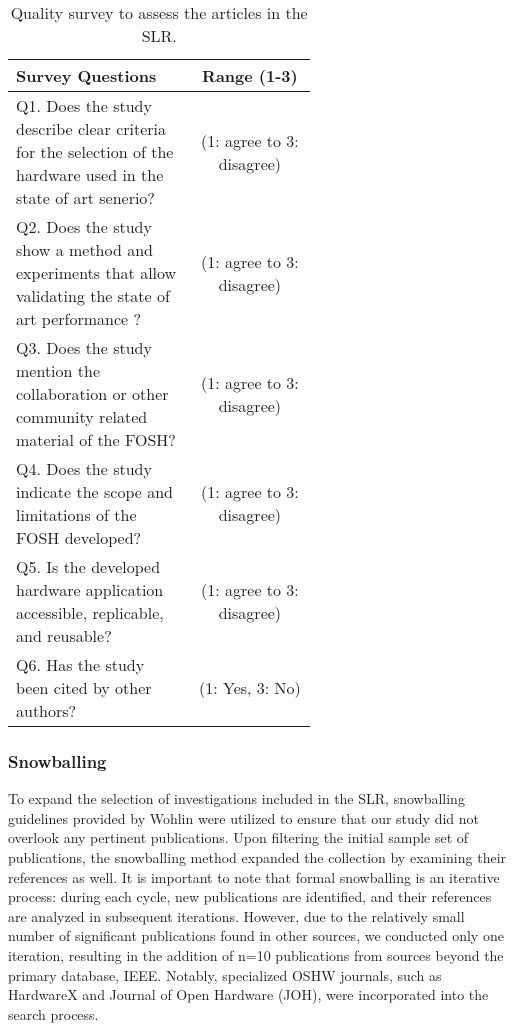 \begin{table}[htbp]
\centering
\caption{Quality survey to assess the articles in the SLR.}
\begin{tabular}{|p{0.6\linewidth}|c|}
\hline
\textbf{Survey Questions} & \textbf{Range (1-3)} \\
\hline
Q1. Does the study describe clear criteria for the selection of the hardware used in the state of art senerio? & (1: agree to 3: disagree) \\
\hline
Q2. Does the study show a method and experiments that allow validating the state of art performance ? & (1: agree to 3: disagree) \\
\hline
Q3. Does the study mention the collaboration or other community related material of the FOSH? & (1: agree to 3: disagree) \\
\hline
Q4. Does the study indicate the scope and limitations of the FOSH developed? & (1: agree to 3: disagree) \\
\hline
Q5. Is the developed hardware application accessible, replicable, and reusable? & (1: agree to 3: disagree) \\
\hline
Q6. Has the study been cited by other authors? & (1: Yes, 3: No) \\
\hline
\end{tabular}
\end{table}


\subsubsection{Snowballing}

To expand the selection of investigations included in the SLR, snowballing guidelines provided by Wohlin \cite{wohlin2014guidelines} were utilized to ensure that our study did not overlook any pertinent publications. 
Upon filtering the initial sample set of publications, the snowballing method expanded the collection by examining their references as well. It is important to note that formal snowballing is an iterative process: during each cycle, new publications are identified, and their references are analyzed in subsequent iterations. 
However, due to the relatively small number of significant publications found in other sources, we conducted only one iteration, resulting in the addition of n=10 publications from sources beyond the primary database, IEEE. Notably, specialized OSHW journals, such as HardwareX and Journal of Open Hardware (JOH), were incorporated into the search process.

